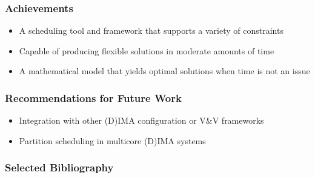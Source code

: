 \documentclass[english, frametitlelogo, mainlogoleft, handout]{beamer}
\begin{document}
\begin{frame}
    \frametitle{Achievements}

    \begin{itemize}
        \item<1-> A scheduling tool and framework that supports a variety of constraints
        \vspace{10pt}
        \item<2-> Capable of producing flexible solutions in moderate amounts of time
        \vspace{10pt}
        \item<3-> A mathematical model that yields optimal solutions when time is not an issue
    \end{itemize}
\end{frame}

\begin{frame}
    \frametitle{Recommendations for Future Work}

    \begin{itemize}
        \item<1-> Integration with other (D)IMA configuration or V\&V frameworks
        \vspace{30pt}
        \item<2-> Partition scheduling in multicore (D)IMA systems
    \end{itemize}
\end{frame}

\nocite{samolej2011arinc, pira2016line}

\begin{frame}
    \frametitle{Selected Bibliography}
    \printbibliography
\end{frame}
\end{document}

